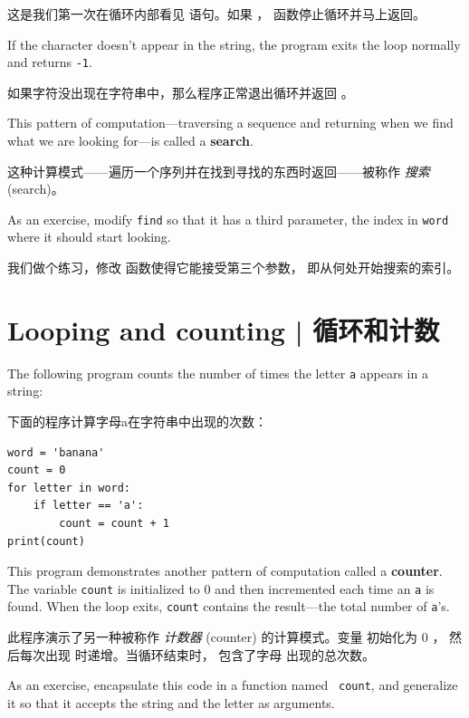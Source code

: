 这是我们第一次在循环内部看见  语句。如果 ，
函数停止循环并马上返回。

If the character doesn't appear in the string, the program
exits the loop normally and  returns {\tt -1}.

如果字符没出现在字符串中，那么程序正常退出循环并返回 。

This pattern of computation---traversing a sequence and returning
when we find what we are looking for---is called a {\bf search}.
    

这种计算模式——遍历一个序列并在找到寻找的东西时返回——被称作 {\em 搜索} (search)。

As an exercise, modify {\tt find} so that it has a
third parameter, the index in {\tt word} where it should start
looking.

我们做个练习，修改  函数使得它能接受第三个参数， 即从何处开始搜索的索引。

\section{Looping and counting  |  循环和计数}
\label{counter}
  
  

The following program counts the number of times the letter {\tt a}
appears in a string:

下面的程序计算字母a在字符串中出现的次数：

\begin{lstlisting}
word = 'banana'
count = 0
for letter in word:
    if letter == 'a':
        count = count + 1
print(count)
\end{lstlisting}

%
This program demonstrates another pattern of computation called a {\bf
counter}.  The variable {\tt count} is initialized to 0 and then
incremented each time an {\tt a} is found.
When the loop exits, {\tt count}
contains the result---the total number of {\tt a}'s.

此程序演示了另一种被称作 {\em 计数器} (counter) 的计算模式。变量  初始化为 0 ， 然后每次出现  时递增。当循环结束时， 包含了字母  出现的总次数。

As an exercise, encapsulate this code in a function named {\tt
count}, and generalize it so that it accepts the string and the
letter as arguments.

